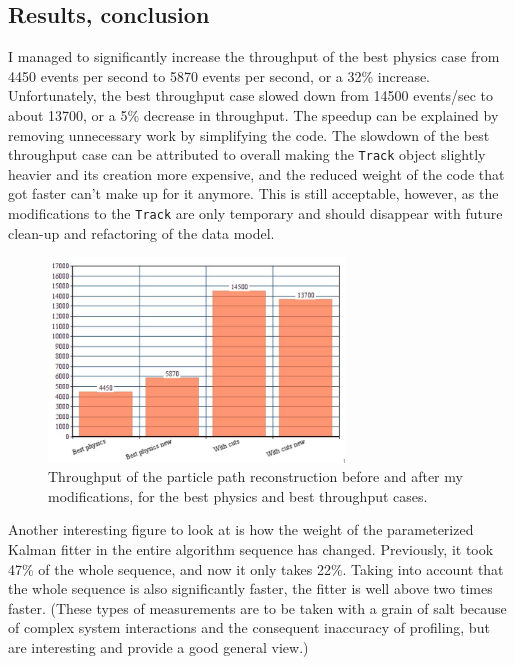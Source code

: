 \documentclass[12pt]{article}
\newcommand{\code}[1]{\texttt{#1}}
\begin{document}
\subsection{Results, conclusion}

I managed to significantly increase the throughput of the best physics case from 4450 events per second to 5870 events per second, or a 32\% increase. Unfortunately, the best throughput case slowed down from 14500 events/sec to about 13700, or a 5\% decrease in throughput. The speedup can be explained by removing unnecessary work by simplifying the code. The slowdown of the best throughput case can be attributed to overall making the \code{Track} object slightly heavier and its creation more expensive, and the reduced weight of the code that got faster can't make up for it anymore. This is still acceptable, however, as the modifications to the \code{Track} are only temporary and should disappear with future clean-up and refactoring of the data model.

\begin{figure}[H]
	\begin{center}
		\includegraphics[width=0.7\textwidth]{kalmanfit_throughput_results_lowquality}
	\end{center}
	\caption[Throughput improvement by the Kalman fitter optimization]{Throughput of the particle path reconstruction before and after my modifications, for the best physics and best throughput cases.}
	\label{fig_kalmanfit_results_throughput}
\end{figure}

Another interesting figure to look at is how the weight of the parameterized Kalman fitter in the entire algorithm sequence has changed. Previously, it took 47\% of the whole sequence, and now it only takes 22\%. Taking into account that the whole sequence is also significantly faster, the fitter is well above two times faster. (These types of measurements are to be taken with a grain of salt because of complex system interactions and the consequent inaccuracy of profiling, but are interesting and provide a good general view.)
\end{document}
